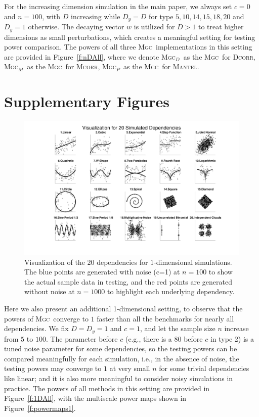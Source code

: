 \documentclass[11pt]{article}
\providecommand{\sct}[1]{{\normalfont\textsc{#1}}}
\newcommand{\Mgc}{\sct{Mgc}}
\newcommand{\Mgcp}{\sct{Mgc$_P$}}
\newcommand{\Mgcd}{\sct{Mgc$_D$}}
\newcommand{\Mgcm}{\sct{Mgc$_M$}}
\newcommand{\Dcorr}{\sct{Dcorr}}
\newcommand{\Mcorr}{\sct{Mcorr}}
\newcommand{\Mantel}{\sct{Mantel}}
\begin{document}
For the increasing dimension simulation in the main paper, we always set $c=0$ and $n=100$, with $D$ increasing while $D_{y}=D$ for type $5,10,14,15,18,20$ and $D_{y}=1$ otherwise. The decaying vector $w$ is utilized for $D>1$ to treat higher dimensions as small perturbations, which creates a meaningful setting for testing power comparison. The powers of all three \Mgc~implementations in this setting are provided in Figure~\ref{f:nDAll}, where we denote \Mgcd~as the \Mgc~for \Dcorr, \Mgcm~as the \Mgc~for \Mcorr, \Mgcp~as the \Mgc~for \Mantel.

\section{Supplementary Figures}
\label{appen:figs}


\begin{figure}[htbp]
\includegraphics[trim={5cm 0 3.5cm 0},clip, width=1.0\textwidth]{../Figures/FigSimVisual}
\caption{Visualization of the $20$ dependencies for $1$-dimensional simulations. The blue points are generated with noise (c=1) at $n=100$ to show the actual sample data in testing, and the red points are generated without noise at $n=1000$ to highlight each underlying dependency.
}
\label{f:dependencies}
\end{figure}

Here we also present an additional 1-dimensional setting, to observe that the powers of \Mgc~converge to $1$ faster than all the benchmarks for nearly all dependencies. We fix $D=D_{y}=1$ and $c=1$, and let the sample size $n$ increase from $5$ to $100$. The parameter before $c$ (e.g., there is a $80$ before $c$ in type 2) is a tuned noise parameter for some dependencies, so the testing powers can be compared meaningfully for each simulation, i.e., in the absence of noise, the testing powers may converge to $1$ at very small $n$ for some trivial dependencies like linear; and it is also more meaningful to consider noisy simulations in practice. The powers of all methods in this setting are provided in Figure~\ref{f:1DAll}, with the multiscale power maps shown in Figure~\ref{f:powermaps1}.
\end{document}
